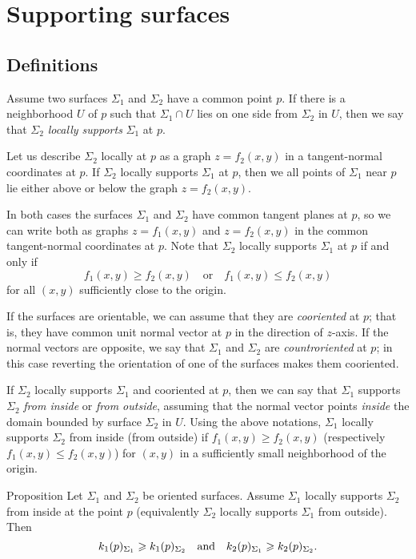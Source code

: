 \chapter{Supporting surfaces}

\section{Definitions}

Assume two surfaces $\Sigma_1$ and $\Sigma_2$ have a common point $p$.
If there is a neighborhood $U$ of $p$ such that $\Sigma_1\cap U$ lies on one side from $\Sigma_2$ in $U$, then we say that $\Sigma_2$ \emph{locally supports} $\Sigma_1$ at $p$.

Let us describe $\Sigma_2$ locally at $p$ as a graph $z=f_2(x,y)$ in a tangent-normal coordinates at $p$.
If $\Sigma_2$ locally supports $\Sigma_1$ at $p$, then we  all points of $\Sigma_1$ near $p$ lie either above or below the graph $z=f_2(x,y)$.

In both cases the surfaces $\Sigma_1$ and $\Sigma_2$ have common tangent planes at $p$,
so we can write both as graphs $z=f_1(x,y)$ and $z=f_2(x,y)$ in the common tangent-normal coordinates at $p$.
Note that $\Sigma_2$ locally supports $\Sigma_1$ at $p$ if and only if 
\[f_1(x,y)\ge f_2(x,y)
\quad\text{or}\quad
f_1(x,y)\le f_2(x,y)\]
for all $(x,y)$ sufficiently close to the origin.

If the surfaces are orientable, we can assume that they are \emph{cooriented} at $p$;
that is, they have common unit normal vector at $p$ in the direction of $z$-axis.
If the normal vectors are opposite, we say that $\Sigma_1$ and $\Sigma_2$ are \emph{countroriented} at $p$;
in this case reverting the orientation of one of the surfaces makes them cooriented.

If $\Sigma_2$ locally supports $\Sigma_1$ and cooriented at $p$,
then we can say that $\Sigma_1$ supports $\Sigma_2$ \emph{from inside} or \emph{from outside},
assuming that the normal vector points {}\emph{inside} the domain bounded by surface $\Sigma_2$ in $U$.
Using the above notations, $\Sigma_1$ locally supports $\Sigma_2$ from inside (from outside)  if $f_1(x,y)\ge f_2(x,y)$ (respectively $f_1(x,y)\le f_2(x,y)$) for $(x,y)$ in a sufficiently small neighborhood of the origin.

\begin{thm}{Proposition}\label{prop:surf-support}
Let $\Sigma_1$ and $\Sigma_2$ be oriented surfaces.
Assume $\Sigma_1$ locally supports $\Sigma_2$ from inside at the point $p$ (equivalently $\Sigma_2$ locally supports $\Sigma_1$ from outside).
Then 
\[k_1(p)_{\Sigma_1}\ge k_1(p)_{\Sigma_2}\quad\text{and}\quad k_2(p)_{\Sigma_1}\z\ge k_2(p)_{\Sigma_2}.\]
\end{thm}

